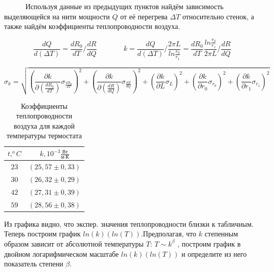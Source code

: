 \documentclass[a4paper,12pt]{article}
\begin{document}
            \ \ \ \ \ \  Используя данные из предыдущих пунктов найдём зависимость выделяющейся на нити мощности $Q$ от её перегрева $\Delta T$ относительно стенок, а также найдём коэффициенты теплопроводности воздуха.

            \[ \frac{dQ}{d(\Delta T)} = \frac{dR_0}{dT} / \frac{dR}{dQ} \ \ \ \ \ \ \ \ \ \ \ \ \ \ \ \ \   k = \frac{dQ}{d(\Delta T)} / \frac{2 \pi L}{ln \frac{r_0}{r_1}} = \frac{dR_0}{dT} \frac{ln \frac{r_0}{r_1}}{2 \pi L} / \frac{dR}{dQ}\]

            \[
            \sigma_k = \sqrt{\left( \frac{\partial k}{\partial \left( \frac{dR_0}{dT} \right)} \sigma_{\frac{dR_0}{dT}} \right)^2 + \left( \frac{\partial k}{\partial \left( \frac{dR}{dQ} \right)} \sigma_{\frac{dR}{dQ}} \right)^2 + \left( \frac{\partial k}{\partial L} \sigma_L \right)^2 + \left( \frac{\partial k}{\partial r_0} \sigma_{r_0} \right)^2 + \left( \frac{\partial k}{\partial r_1} \sigma_{r_1} \right)^2}
        \]

            \begin{table}[!ht]
                \centering
                \begin{tabular}{|c|c|}
                    \hline

                    $t, ^oC$ & $k, 10^{-3}\frac{\text{Вт}}{\text{м} \cdot \text{К}}$\\ \hline
                    $23$ & $(25,57 \pm  0,33)$\\ \hline
                    $30$ & $(26,32 \pm  0,29)$\\ \hline
                    $42$ & $(27,31 \pm  0,39)$\\ \hline
                    $59$ & $(28,56 \pm  0,38)$\\ \hline

                \end{tabular}
                \caption{Коэффициенты теплопроводности воздуха для каждой температуры термостата}
                \label{k_table}
            \end{table}

            Из графика видно, что экспер. значения теплопроводности близки к табличным. \\

            Теперь построим график $ln(k)(ln(T))$.Предполагая, что $k$ степенным образом зависит от абсолютной температуры $T$: $T \sim k^{\beta}$ , построим график в двойном логарифмическом масштабе $ln(k)(ln(T))$  и определите из него показатель степени $\beta$.
\end{document}
